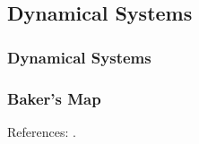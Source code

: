 \documentclass[]{article}
\begin{document}
\subsection{Dynamical Systems} 

\subsubsection{Dynamical Systems} 

\subsubsection{Baker's Map}

References: \cite[Chapter 7]{moore2011nature}.



\printglossaries

 

\raggedright
{}

\end{document}
